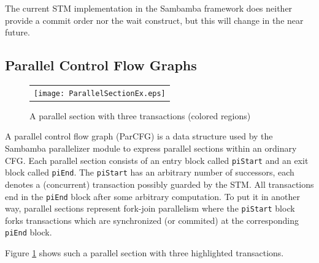 The current STM implementation in the Sambamba framework does neither provide a 
commit order nor the wait construct, but this will change in the near future.


\clearpage

\subsection{Parallel Control Flow Graphs}
\begin{figure}
  \centering
  \begin{minipage}[c][0.43\width]{\textwidth}
  \begin{tabular}{c}
  \texttt{[image: ParallelSectionEx.eps]}
  \end{tabular}
  \end{minipage}
  \caption{A parallel section with three transactions (colored regions)}
  \label{fig:ParallelSectionEx}  
\end{figure}
A parallel control flow graph (ParCFG) is a data structure used by the
Sambamba parallelizer module to express parallel sections within an ordinary CFG. 
Each parallel section consists of an entry block called \texttt{piStart} and
an exit block called \texttt{piEnd}.
The \texttt{piStart} has an arbitrary number of successors, each denotes a
(concurrent) transaction possibly guarded by the STM. All transactions end in the 
\texttt{piEnd} block after some arbitrary computation. 
To put it in another way, parallel sections represent 
fork-join parallelism where the \texttt{piStart} block forks transactions 
which are synchronized (or commited) at the corresponding \texttt{piEnd} block. 

Figure \ref{fig:ParallelSectionEx} shows such a parallel section with three 
highlighted transactions. 

